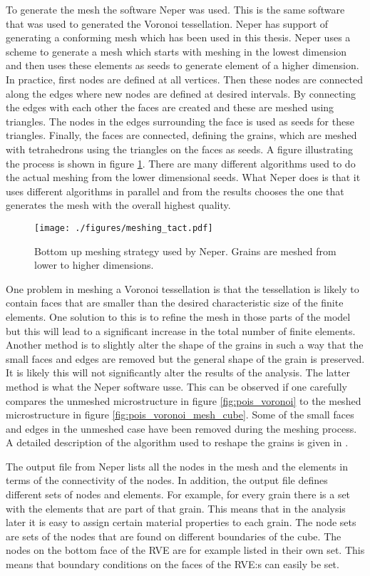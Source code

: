 \documentclass[meshing_micro.tex]{subfiles}
\begin{document}
To generate the mesh the software Neper\cite{Quey20111729} was used. 
This is the same software that was used to generated the Voronoi tessellation. Neper has support of generating a conforming mesh which has been used in this thesis. Neper uses a scheme to generate a mesh which starts with meshing in the lowest dimension and then uses these elements as seeds to generate element of a higher dimension.  In practice, first nodes are defined at all vertices. Then these nodes are connected along the edges where new nodes are defined at desired intervals. 
By connecting the edges with each other the faces are created and these are meshed using triangles. The nodes in the edges surrounding the face is used as seeds for these triangles. Finally, the faces are connected, defining the grains, which are meshed with tetrahedrons using the triangles on the faces as seeds. A figure illustrating the process is shown in figure \ref{fig:mesh_strat}. There are many different algorithms used to do the actual meshing from the lower dimensional seeds. 
What Neper does is that it uses different algorithms in parallel and from the results chooses the one that generates the mesh with the overall highest quality.

 \begin{figure}[htpb!]
\centering
  \texttt{[image: ./figures/meshing\_tact.pdf]}
\caption{Bottom up meshing strategy used by Neper. Grains are meshed from lower to higher dimensions.}
\label{fig:mesh_strat}
\end{figure}


One problem in meshing a Voronoi tessellation is that the tessellation is likely to contain faces that are smaller than the desired characteristic size of the finite elements. One solution to this is to refine the mesh in those parts of the model but this will lead to a significant increase in the total number of finite elements.  Another method is to slightly alter the shape of the grains in such a way that the small faces and edges are removed but the general shape of the grain is preserved. It is likely this will not significantly alter the results of the analysis. The latter method is what the Neper software usse. This can be observed if one carefully compares the unmeshed microstructure in figure \ref{fig:pois_voronoi} to the meshed microstructure in figure \ref{fig:pois_voronoi_mesh_cube}. Some of the small faces and edges in the unmeshed case have been removed during the meshing process. A detailed description of the algorithm used to reshape the grains is given in \cite{Quey20111729}.
 
The output file from Neper lists all the nodes in the mesh and the elements in terms of the connectivity of the nodes. In addition, the output file defines different sets of nodes and elements. For example, for every grain there is a set with the elements that are part of that grain. This means that in the analysis later it is easy to assign certain material properties to each grain. The node sets are sets of the nodes that are found on different boundaries of the cube. The nodes on the bottom face of the RVE are for example listed in their own set. This means that boundary conditions on the faces of the RVE:s can easily be set.
\end{document}
